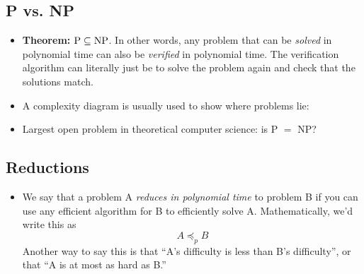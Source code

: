 \subsection{P vs. NP}
\begin{itemize}
	\item \textbf{Theorem:} \(\text P \subseteq \text{NP}\). In other words, any problem that can be 
		\textit{solved} in polynomial time can also be \textit{verified} in polynomial time. The verification 
		algorithm can literally just be to solve the problem again and check that the solutions match.
	\item A complexity diagram is usually used to show where problems lie:
		\begin{center}
		\end{center}
	\item Largest open problem in theoretical computer science: is P \(=\) NP? 
\end{itemize}
\subsection{Reductions}
\begin{itemize}
	\item We say that a problem A \textit{reduces in polynomial time} to problem B if you can use any efficient
		algorithm for B to efficiently solve A. Mathematically, we'd write this as 
		\[
		A \preceq_p B
		\] 
		Another way to say this is that ``A's difficulty is less than B's difficulty'', or that ``A is at most 
		as hard as B.''
\end{itemize}
